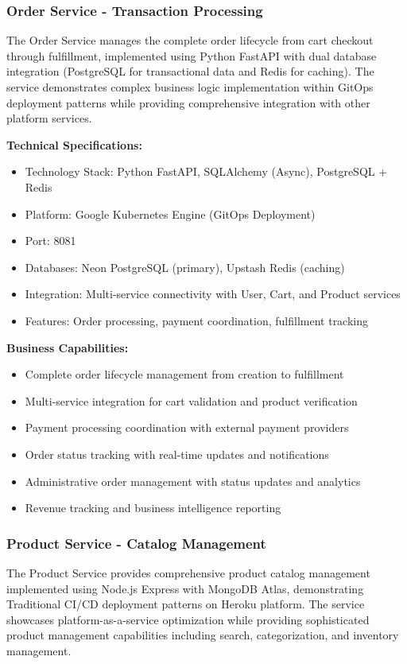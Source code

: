 \subsubsection{Order Service - Transaction Processing}

The Order Service manages the complete order lifecycle from cart checkout through fulfillment, implemented using Python FastAPI with dual database integration (PostgreSQL for transactional data and Redis for caching). The service demonstrates complex business logic implementation within GitOps deployment patterns while providing comprehensive integration with other platform services.

\textbf{Technical Specifications:}
\begin{itemize}
\item Technology Stack: Python FastAPI, SQLAlchemy (Async), PostgreSQL + Redis
\item Platform: Google Kubernetes Engine (GitOps Deployment)
\item Port: 8081
\item Databases: Neon PostgreSQL (primary), Upstash Redis (caching)
\item Integration: Multi-service connectivity with User, Cart, and Product services
\item Features: Order processing, payment coordination, fulfillment tracking
\end{itemize}

\textbf{Business Capabilities:}
\begin{itemize}
\item Complete order lifecycle management from creation to fulfillment
\item Multi-service integration for cart validation and product verification
\item Payment processing coordination with external payment providers
\item Order status tracking with real-time updates and notifications
\item Administrative order management with status updates and analytics
\item Revenue tracking and business intelligence reporting
\end{itemize}

\subsubsection{Product Service - Catalog Management}

The Product Service provides comprehensive product catalog management implemented using Node.js Express with MongoDB Atlas, demonstrating Traditional CI/CD deployment patterns on Heroku platform. The service showcases platform-as-a-service optimization while providing sophisticated product management capabilities including search, categorization, and inventory management.

